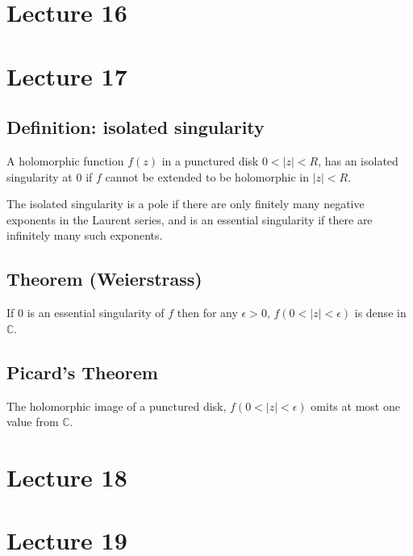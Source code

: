\documentclass[11pt]{article}
\newcommand{\C}{\mathbb{C}}
\begin{document}
\section{Lecture 16}

\section{Lecture 17}
\subsection{Definition: isolated singularity}
A holomorphic function $f(z)$ in a punctured disk $0 < |z| < R$, has an isolated singularity at $0$ if $f$ cannot be extended to be holomorphic in $|z| < R$. 

The isolated singularity is a pole if there are only finitely many negative exponents in the Laurent series, and is an essential singularity if there are infinitely many such exponents. 

\subsection{Theorem (Weierstrass)}
If $0$ is an essential singularity of $f$ then for any $\epsilon > 0$, $f(0 < |z| < \epsilon)$ is dense in $\C$. 

\subsection{Picard's Theorem}
The holomorphic image of a punctured disk, $f(0 < |z| < \epsilon)$ omits at most one value from $\C$. 

\section{Lecture 18}

\section{Lecture 19}
\end{document}
